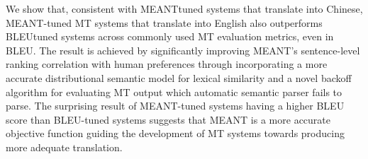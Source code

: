 We show that, consistent with MEANTtuned systems that translate into Chinese, MEANT-tuned MT systems that translate into English also outperforms BLEUtuned systems across commonly used MT evaluation metrics, even in BLEU. The result is achieved by significantly improving MEANT's sentence-level ranking correlation with human preferences through incorporating a more accurate distributional semantic model for lexical similarity and a novel backoff algorithm for evaluating MT output which automatic semantic parser fails to parse. The surprising result of MEANT-tuned systems having a higher BLEU score than BLEU-tuned systems suggests that MEANT is a more accurate objective function guiding the development of MT systems towards producing more adequate translation.
